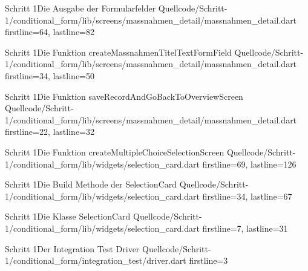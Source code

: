 \begin{alexlisting}{Schritt 1}{Die Ausgabe der Formularfelder}
  {Quellcode/Schritt-1/conditional_form/lib/screens/massnahmen_detail/massnahmen_detail.dart}
  {firstline=64, lastline=82}
  \label{lst:Schritt1AusgabeDerFormularfelder}
\end{alexlisting}

\begin{alexlisting}{Schritt 1}{Die Funktion createMassnahmenTitelTextFormField}
  {Quellcode/Schritt-1/conditional_form/lib/screens/massnahmen_detail/massnahmen_detail.dart}
  {firstline=34, lastline=50}
  \label{lst:Schritt1DieFunktionCreateMassnahmenTitelTextFormField}
\end{alexlisting}

\begin{alexlisting}{Schritt 1}{Die Funktion saveRecordAndGoBackToOverviewScreen}
  {Quellcode/Schritt-1/conditional_form/lib/screens/massnahmen_detail/massnahmen_detail.dart}
  {firstline=22, lastline=32}
  \label{lst:Schritt1SaveRecordAndGoBackToOverviewScreen}
\end{alexlisting}





\begin{alexlisting}{Schritt 1}{Die Funktion createMultipleChoiceSelectionScreen}
  {Quellcode/Schritt-1/conditional_form/lib/widgets/selection_card.dart}
  {firstline=69, lastline=126}
  \label{lst:Schritt1FunktionCreateMultipleChoiceSelectionScreen}
\end{alexlisting}

\begin{alexlisting}{Schritt 1}{Die Build Methode der SelectionCard}
  {Quellcode/Schritt-1/conditional_form/lib/widgets/selection_card.dart}
  {firstline=34, lastline=67}
  \label{lst:Schritt1BuildMethodeDerSelectionCard}
\end{alexlisting}

\begin{alexlisting}{Schritt 1}{Die Klasse SelectionCard}
  {Quellcode/Schritt-1/conditional_form/lib/widgets/selection_card.dart}
  {firstline=7, lastline=31}
  \label{lst:Schritt1KlasseSelectionCard}
\end{alexlisting}


\begin{alexlisting}{Schritt 1}{Der Integration Test Driver}
  {Quellcode/Schritt-1/conditional_form/integration_test/driver.dart}
  {firstline=3}
  \label{lst:Schritt1IntegrationTestDriver}
\end{alexlisting}


